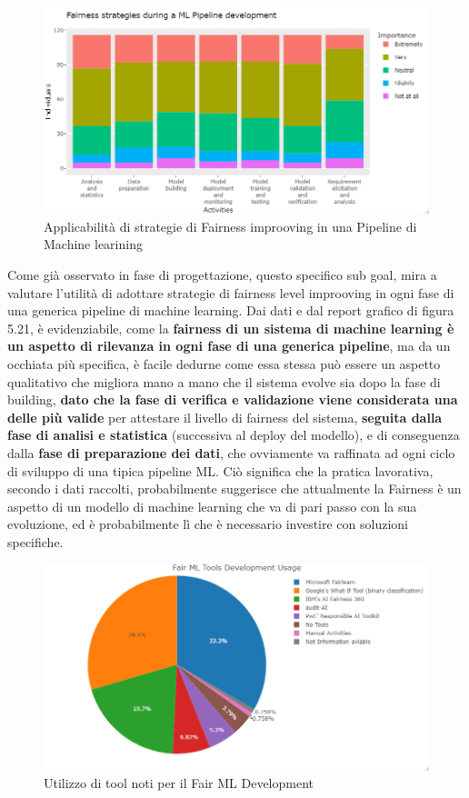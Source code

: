      \begin{figure}[h!]
        \centering
        \includegraphics[width=1\textwidth]{figure/Analisi/RQ4/Fairness strategies during a ML Pipeline development.png}
        \caption{Applicabilità di strategie di Fairness improoving in una Pipeline di Machine learining}
    \end{figure}
    Come già osservato in fase di progettazione, questo specifico sub goal, mira a valutare l'utilità di adottare strategie di fairness level improoving in ogni fase di una generica pipeline di machine learning. Dai dati e dal report grafico di figura 5.21, è  evidenziabile, come la \textbf{fairness di un sistema di machine learning è un aspetto di rilevanza in ogni fase di una generica pipeline}, ma da un occhiata più specifica, è facile dedurne come essa stessa può essere un aspetto qualitativo che migliora mano a mano che il sistema evolve sia dopo la fase di building, \textbf{dato che la fase di verifica e validazione viene considerata una delle più valide} per attestare il livello di fairness del sistema, \textbf{seguita dalla fase di analisi e statistica} (successiva al deploy del modello), e di conseguenza dalla \textbf{fase di preparazione dei dati}, che ovviamente va raffinata ad ogni ciclo di sviluppo di una tipica pipeline ML. Ciò significa che la pratica lavorativa, secondo i dati raccolti, probabilmente suggerisce che attualmente la Fairness è un aspetto di un modello di machine learning che va di pari passo con la sua evoluzione, ed è probabilmente lì che è necessario investire con soluzioni specifiche.
    
    \begin{figure}[h!]
        \centering
        \includegraphics[width=1\textwidth]{figure/Analisi/RQ4/Fair ML Tools Development Usage.png}
        \caption{Utilizzo di tool noti per il Fair ML Development}
    \end{figure}
    
